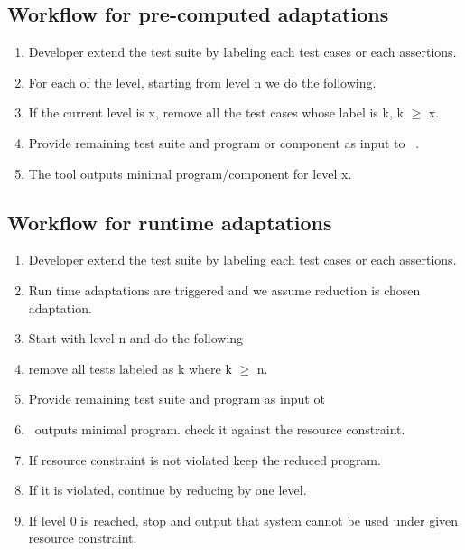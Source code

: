 \subsection{Workflow for pre-computed adaptations}
\begin{enumerate}
\item Developer extend the test suite by labeling each test cases or each assertions. 
\item For each of the level, starting from level n we do the following.
\item If the current level is x, remove all the test cases whose label is k, k $\geq$ x.
\item Provide remaining test suite and program or component as input to \mytool\ . 
\item The tool outputs minimal program/component for level x.   
\end{enumerate} 

\subsection{Workflow for runtime adaptations}

\begin{enumerate}
\item Developer extend the test suite by labeling each test cases or each assertions.
\item Run time adaptations are triggered and we assume reduction is chosen adaptation.
\item Start with level n and do the following
\item remove all tests labeled as k where k $\geq$ n. 
\item Provide remaining test suite and program as input ot \mytool\
\item \mytool\ outputs minimal program. check it against the resource constraint.
\item If resource constraint is not violated keep the reduced program.
\item If it is violated, continue by reducing by one level. 
\item If level 0 is reached, stop and output that system cannot be used under given resource constraint.
\end{enumerate}

